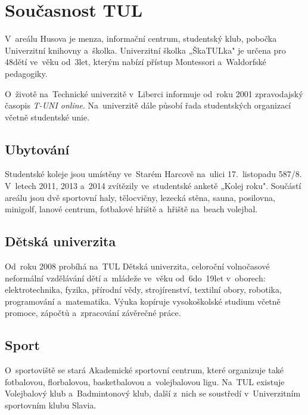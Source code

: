 \documentclass[a4paper,12pt,fonts]{./tulpackage/tularticle}
\begin{document}
\clearpage

\section{Současnost TUL}

V~areálu Husova je menza, informační centrum, studentský klub, pobočka Univerzitní knihovny a~školka. Univerzitní školka „ŠkaTULka" je určena pro 48\thinspace{}dětí ve~věku od~3\thinspace{}let, kterým nabízí přístup Montessori a~Waldorfské pedagogiky.~\cite{jandova} %

O~životě na~Technické univerzitě v~Liberci informuje od~roku 2001 zpravodajský časopis \textit{T-UNI online}. Na~univerzitě dále působí řada studentských organizací včetně studentské unie.~\cite{jandova}

\subsection{Ubytování}

Studentské koleje jsou umístěny ve~Starém Harcově na~ulici 17.~listopadu 587/8. V~letech 2011, 2013 a~2014 zvítězily ve~studentské anketě „Kolej roku". Součástí areálu jsou dvě sportovní haly, tělocvičny, lezecká stěna, sauna, posilovna, minigolf, lanové centrum, fotbalové hřiště a~hřiště na~beach volejbal.~\cite{menzy}

\subsection{Dětská univerzita}

Od~roku 2008 probíhá na~TUL Dětská univerzita, celoroční volnočasové neformální vzdělávání dětí a~mládeže ve~věku od~6\thinspace{}do~19\thinspace{}let v~oborech: elektrotechnika, fyzika, přírodní vědy, strojírenství, textilní obory, robotika, programování a~matematika. Výuka kopíruje vysokoškolské studium včetně promoce, zápočtů a~zpracování závěrečné práce.
~\cite{jandova} %

\subsection{Sport}

O~sportoviště se stará Akademické sportovní centrum, které organizuje také fotbalovou, florbalovou, basketbalovou a~volejbalovou ligu. Na~TUL existuje Volejbalový klub a~Badmintonový klub, další z~nich se soustředí v~Univerzitním sportovním klubu Slavia.
~\cite{golka}
\end{document}
